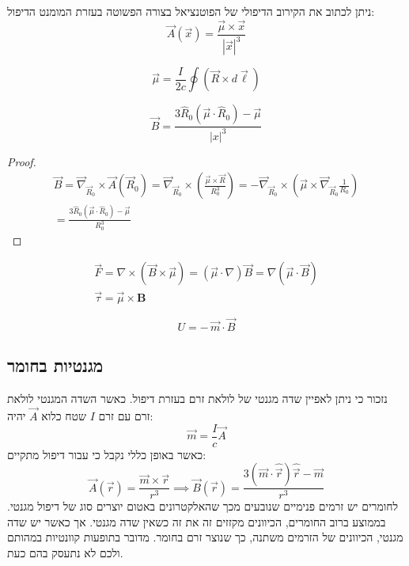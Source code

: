 \documentclass{tstextbook}
\begin{document}
\begin{corollary}
ניתן לכתוב את הקירוב הדיפולי של הפוטנציאל בצורה הפשוטה בעזרת המומנט הדיפול:
$$\vec{A}\left( \vec{x} \right)={\frac{\vec{\mu}\times\vec{x}}{|\vec{x}|^{3}}}$$

\end{corollary}
\begin{proposition}
$${\vec{\mu}}={\frac{I}{2c}}\oint\left({\vec{R}}\times d{\vec{\ell}}\right)$$

\end{proposition}
\begin{proposition}
$$\vec{B} =\frac{3\hat{R}_{0}\left(\vec{\mu}\cdot\hat{R}_{0}\right)-\vec{\mu}}{|x|^{3}}$$

\end{proposition}
\begin{proof}
$$\begin{gather}\vec{B}=\vec{\nabla}_{\vec{R}_{0}}\times\vec{A}\left(\vec{R}_{0}\right)=\vec{\nabla}_{\vec{R}_{0}}\times\left(\frac{\vec{\mu}\times\vec{R}}{R_{0}^{3}}\right)=-\vec{\nabla}_{\vec{R}_{0}}\times\left(\vec{\mu}\times\vec{\nabla}_{\vec{R}_{0}}\frac{1}{R_{0}}\right)\\=\frac{3\hat{R}_{0}\left(\vec{\mu}\cdot\hat{R}_{0}\right)-\vec{\mu}}{R_{0}^{3}} 
\end{gather}$$

\end{proof}
\begin{proposition}
$$\begin{gather}\vec{F}=\nabla\times\left( \vec{B}\times\vec{\mu} \right)=\left( \vec{\mu}\cdot\nabla \right)\vec{B}=\nabla\left( \vec{\mu}\cdot\vec{B} \right)  \\{\vec{\tau}}={\vec{\mu}}\times{\textbf{B}}
\end{gather}$$

\end{proposition}
\begin{proposition}
$$U=-\,\vec{m}\cdot\vec{B}$$

\end{proposition}
\subsection{מגנטיות בחומר}

נזכור כי ניתן לאפיין שדה מגנטי של לולאת זרם בעזרת דיפול. כאשר השדה המגנטי לולאת זרם עם זרם \(I\) שטח כלוא \(\vec{A}\) יהיה:
$$\vec{m} = \frac{I}{c}\vec{A}$$
כאשר באופן כללי נקבל כי עבור דיפול מתקיים:
$$\vec{A}\left( \vec{r} \right)={\frac{\vec{m}\times\vec{r}}{r^{3}}}\implies\vec{B}\left( \vec{r} \right)={\frac{3\left( \vec{m}\cdot{\hat{\vec{r}}} \right){\hat{\vec{r}}}-\vec{m}}{r^{3}}}$$
לחומרים יש זרמים פנימיים שנובעים מכך שהאלקטרונים באטום יוצרים סוג של דיפול מגנטי. בממוצע ברוב החומרים, הכיוונים מקזזים זה את זה כשאין שדה מגנטי. אך כאשר יש שדה מגנטי, הכיוונים של הזרמים משתנה, כך שנוצר זרם בחומר. מדובר בתופעות קוונטיות במהותם ולכם לא נתעסק בהם כעת.
\end{document}
